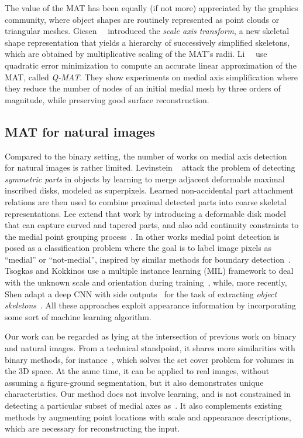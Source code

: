 \documentclass[10pt,twocolumn,letterpaper]{article}
\begin{document}
The value of the MAT has been equally (if not more) appreciated by the graphics community, where object shapes 
are routinely represented as point clouds or triangular meshes.
Giesen~\etal~\cite{giesen2009scale} introduced the \emph{scale axis transform}, a new skeletal shape representation
that yields a hierarchy of successively simplified skeletons, which are obtained by multiplicative scaling of the
MAT's radii.
Li~\etal~\cite{li2015q} use quadratic error minimization to compute an accurate linear approximation of the MAT, called \emph{Q-MAT}.
They show experiments on medial axis simplification where they reduce the number of nodes of an initial medial mesh
by three orders of magnitude, while preserving good surface reconstruction.


\subsection{MAT for natural images}\label{sec:related:natural}
Compared to the binary setting, the number of works on medial axis detection for natural images is rather limited.
Levinstein \etal~\cite{levinshtein2009multiscale} attack the problem of detecting \emph{symmetric parts} in objects
by learning to merge adjacent deformable maximal inscribed disks, modeled as superpixels.
Learned non-accidental part attachment relations are then used to combine proximal detected parts into coarse skeletal representations.
Lee \etal extend that work by introducing a deformable disk model that can capture curved and tapered parts, and also add
continuity constraints to the medial point grouping process~\cite{lee2013detecting}.
In other works medial point detection is posed as a classification problem where the goal is to label image pixels
as ``medial'' or ``not-medial'', inspired by similar methods for boundary detection~\cite{martin2004learning,arbelaez2011contour}.
Tsogkas and Kokkinos use a multiple instance learning (MIL) framework to deal with the unknown scale and orientation 
during training~\cite{tsogkas2012learning}, while, more recently, Shen \etal adapt a deep CNN with 
side outputs~\cite{xie2015holistically} for the task of extracting \emph{object skeletons}~\cite{shen2016object}.
All these approaches exploit appearance information by incorporating some sort of machine learning algorithm.

Our work can be regarded as lying at the intersection of previous work on binary and natural images.
From a technical standpoint, it shares more similarities with binary methods, for instance~\cite{stolpner2012medial},
which solves the set cover problem for volumes in the 3D space.
At the same time, it can be applied to real images, without assuming a figure-ground segmentation,
but it also demonstrates unique characteristics.
Our method does not involve learning, and is not constrained in detecting a particular subset of
medial axes as~\cite{tsogkas2012learning,shen2016object}.
It also complements existing methods by augmenting point locations with scale and appearance descriptions, which
are necessary for reconstructing the input.
\end{document}
